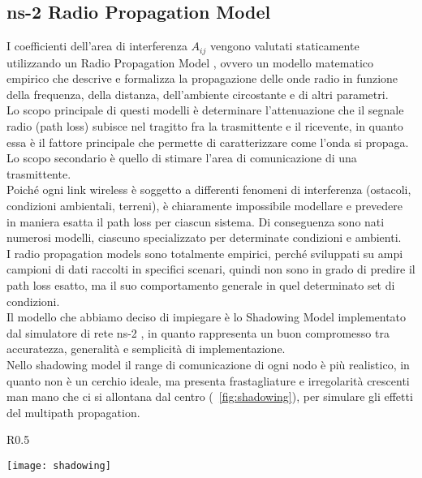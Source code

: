 \subsection{ns-2 Radio Propagation Model}
I coefficienti dell'area di interferenza $A_{ij}$ vengono valutati staticamente utilizzando un Radio Propagation Model \cite{seybold2005introduction}, ovvero un modello matematico empirico che descrive e formalizza la propagazione delle onde radio in funzione della frequenza, della distanza, dell'ambiente circostante e di altri parametri. \\
Lo scopo principale di questi modelli è determinare l'attenuazione che il segnale radio (path loss) subisce nel tragitto fra la trasmittente e il ricevente, in quanto essa è il fattore principale che permette di caratterizzare come l'onda si propaga. Lo scopo secondario è quello di stimare l'area di comunicazione di una trasmittente.\\
Poiché ogni link wireless è soggetto a differenti fenomeni di interferenza (ostacoli, condizioni ambientali, terreni), è chiaramente impossibile modellare e prevedere in maniera esatta il path loss per ciascun sistema. Di conseguenza sono nati numerosi modelli, ciascuno specializzato per determinate condizioni e ambienti. \\
I radio propagation models sono totalmente empirici, perché sviluppati su ampi campioni di dati raccolti in specifici scenari, quindi non sono in grado di predire il path loss esatto, ma il suo comportamento generale in quel determinato set di condizioni.  \\
Il modello che abbiamo deciso di impiegare è lo Shadowing Model implementato dal simulatore di rete ns-2 \cite{nsMan}, in quanto rappresenta un buon compromesso tra accuratezza, generalità e semplicità di implementazione. \\
Nello shadowing model il range di comunicazione di ogni nodo è più realistico, in quanto non è un cerchio ideale, ma presenta frastagliature e irregolarità crescenti man mano che ci si allontana dal centro (\figurename\ \ref{fig:shadowing}), per simulare gli effetti del multipath propagation. \\
%
\begin{wrapfigure}{R}{0.5\textwidth}
	\begin{center}
		\texttt{[image: shadowing]}
	\end{center}
	\caption{Range di comunicazione nello Shadowing Model\label{fig:shadowing}}
\end{wrapfigure}
%
